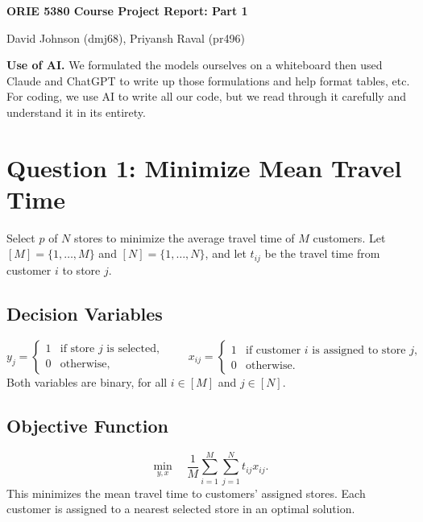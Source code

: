 \documentclass{article}
\begin{document}
\begin{center}
{\Large\bfseries ORIE 5380 Course Project Report: Part 1 \par}
\vspace{1.2em}
{\normalsize David Johnson (dmj68), Priyansh Raval (pr496) \par}
\vspace{2em}
\end{center}

\textbf{Use of AI.} 
We formulated the models ourselves on a whiteboard then used Claude and ChatGPT to write up those formulations and help format tables, etc. For coding, we use AI to write all our code, but we read through it carefully and understand it in its entirety.

\section*{Question 1: Minimize Mean Travel Time}

Select $p$ of $N$ stores to minimize the average travel time of $M$ customers.
Let $[M]=\{1,\ldots,M\}$ and $[N]=\{1,\ldots,N\}$, and let $t_{ij}$ be the travel time from customer $i$ to store $j$.

\subsection*{Decision Variables}
\[
y_j = \begin{cases}
1 & \text{if store $j$ is selected},\\
0 & \text{otherwise},
\end{cases}
\qquad
x_{ij} = \begin{cases}
1 & \text{if customer $i$ is assigned to store $j$},\\
0 & \text{otherwise}.
\end{cases}
\]
Both variables are binary, for all $i\in[M]$ and $j\in[N]$.

\subsection*{Objective Function}
\begin{equation}
\min_{y,x}\quad \frac{1}{M}\sum_{i=1}^{M}\sum_{j=1}^{N}t_{ij}x_{ij}.
\label{eq:mean-obj}
\end{equation}
This minimizes the mean travel time to customers' assigned stores. Each customer is
assigned to a nearest selected store in an optimal solution.
\end{document}

